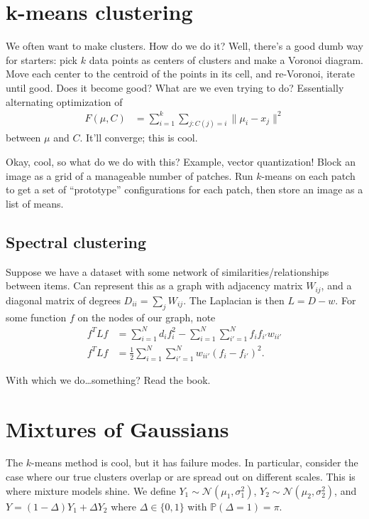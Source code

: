 \documentclass[11pt,letterpaper]{article}
\theoremstyle{definition}
\theoremstyle{plain}
\numberwithin{equation}{section}
\numberwithin{figure}{section}
\begin{document}
\section{k-means clustering}
We often want to make clusters. How do we do it? Well, there's a good dumb way for starters: pick $k$ data points as centers of clusters and make a Voronoi diagram. Move each center to the centroid of the points in its cell, and re-Voronoi, iterate until good. Does it become good? What are we even trying to do? Essentially alternating optimization of
%
\begin{align}
	F(\mu,C) &= \sum_{i=1}^k \sum_{j:C(j)=i} \|\mu_i-x_j\|^2
\end{align}
%
between $\mu$ and $C$. It'll converge; this is cool.


Okay, cool, so what do we do with this? Example, vector quantization! Block an image as a grid of a manageable number of patches. Run $k$-means on each patch to get a set of ``prototype'' configurations for each patch, then store an image as a list of means.


\subsection{Spectral clustering}
Suppose we have a dataset with some network of similarities/relationships between items. Can represent this as a graph with adjacency matrix $W_{ij}$, and a diagonal matrix of degrees $D_{ii} = \sum_{j} W_{ij}$. The Laplacian is then $L = D - w$. For some function $f$ on the nodes of our graph, note
%
\begin{align}
	f^T L f &= \sum_{i=1}^N d_i f_i^2 - \sum_{i=1}^N \sum_{i'=1}^N f_i f_{i'} w_{ii'}\\
	f^T L f &= \frac{1}{2} \sum_{i=1}^N \sum_{i'=1}^N w_{ii'} (f_i - f_{i'})^2.
\end{align}

With which we do\ldots something? Read the book.














\section{Mixtures of Gaussians}
The $k$-means method is cool, but it has failure modes. In particular, consider the case where our true clusters overlap or are spread out on different scales. This is where mixture models shine. We define $Y_1 \sim \mathcal{N}(\mu_1,\sigma_1^2)$, $Y_2 \sim \mathcal{N}(\mu_2,\sigma_2^2)$, and $Y = (1-\Delta) Y_1 + \Delta Y_2$ where $\Delta \in \{0,1\}$ with $\mathbb{P}(\Delta = 1) = \pi$.
\end{document}
